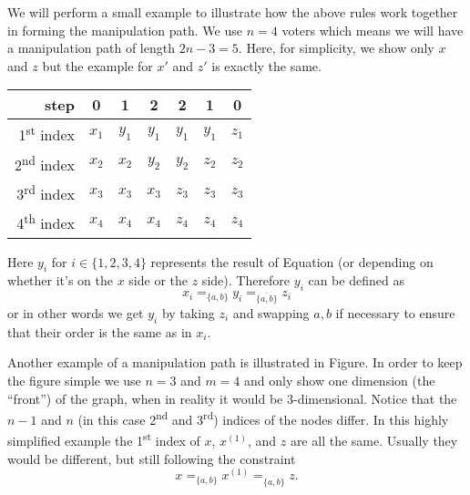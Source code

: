 	We will perform a small example to illustrate how the above rules work together in forming the manipulation path. We use $n = 4$ voters which means we will have a manipulation path of length $2n - 3 = 5$. Here, for simplicity, we show only $x$ and $z$ but the example for $x'$ and $z'$ is exactly the same.
	\begin{center}
		\begin{tabular}{r | c c c c c c}
			step                        &   0       &   1       &   2       &   2       &   1       &   0       \\
			\hline
			1\textsuperscript{st} index &   $x_1$   &   $y_1$   &   $y_1$   &   $y_1$   &   $y_1$   &   $z_1$   \\
			2\textsuperscript{nd} index &   $x_2$   &   $x_2$   &   $y_2$   &   $y_2$   &   $z_2$   &   $z_2$   \\
			3\textsuperscript{rd} index &   $x_3$   &   $x_3$   &   $x_3$   &   $z_3$   &   $z_3$   &   $z_3$   \\
			4\textsuperscript{th} index &   $x_4$   &   $x_4$   &   $x_4$   &   $z_4$   &   $z_4$   &   $z_4$   \\
		\end{tabular}
	\end{center}
	Here $y_i$ for $i \in \{1, 2, 3, 4\}$ represents the result of Equation (or depending on whether it's on the $x$ side or the $z$ side). Therefore $y_i$ can be defined as
	\[
		x_i =_{\{a, b\}} y_i =_{\overline{\{a, b\}}} z_i
	\]
	or in other words we get $y_i$ by taking $z_i$ and swapping $a, b$ if necessary to ensure that their order is the same as in $x_i$.

	Another example of a manipulation path is illustrated in Figure. In order to keep the figure simple we use $n = 3$ and $m = 4$ and only show one dimension (the ``front'') of the graph, when in reality it would be 3-dimensional. Notice that the $n - 1$ and $n$ (in this case 2\textsuperscript{nd} and 3\textsuperscript{rd}) indices of the nodes differ. In this highly simplified example the 1\textsuperscript{st} index of $x$, $x^{(1)}$, and $z$ are all the same. Usually they would be different, but still following the constraint
	\[
		x =_{\{a, b\}} x^{(1)} =_{\overline{\{a, b\}}} z.
	\]


